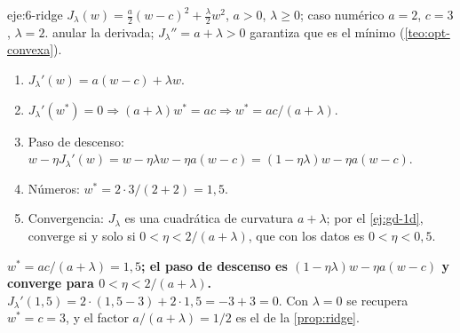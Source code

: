 \begin{solucion}{eje:6-ridge}
\datos $J_\lambda(w)=\frac{a}{2}(w-c)^{2}+\frac{\lambda}{2}w^{2}$, $a>0$, $\lambda\ge 0$; caso numérico $a=2$, $c=3$, $\lambda=2$.
\planteamiento anular la derivada; $J_\lambda''=a+\lambda>0$ garantiza que es el mínimo (\cref{teo:opt-convexa}).
\pasos
\begin{enumerate}[label=\arabic*.]
  \item $J_\lambda'(w)=a(w-c)+\lambda w$.
  \item $J_\lambda'(w^{\ast})=0\Rightarrow(a+\lambda)w^{\ast}=ac\Rightarrow w^{\ast}=ac/(a+\lambda)$.
  \item Paso de descenso: $w-\eta J_\lambda'(w)=w-\eta\lambda w-\eta a(w-c)=(1-\eta\lambda)w-\eta a(w-c)$.
  \item Números: $w^{\ast}=2\cdot 3/(2+2)=1{,}5$.
  \item Convergencia: $J_\lambda$ es una cuadrática de curvatura $a+\lambda$; por el \cref{ej:gd-1d}, converge si y solo si $0<\eta<2/(a+\lambda)$, que con los datos es $0<\eta<0{,}5$.
\end{enumerate}
\resultado \textbf{$w^{\ast}=ac/(a+\lambda)=1{,}5$; el paso de descenso es $(1-\eta\lambda)w-\eta a(w-c)$ y converge para $0<\eta<2/(a+\lambda)$.}
\comprobacion $J_\lambda'(1{,}5)=2\cdot(1{,}5-3)+2\cdot 1{,}5=-3+3=0$. Con $\lambda=0$ se recupera $w^{\ast}=c=3$, y el factor $a/(a+\lambda)=1/2$ es el de la \cref{prop:ridge}.
\end{solucion}

